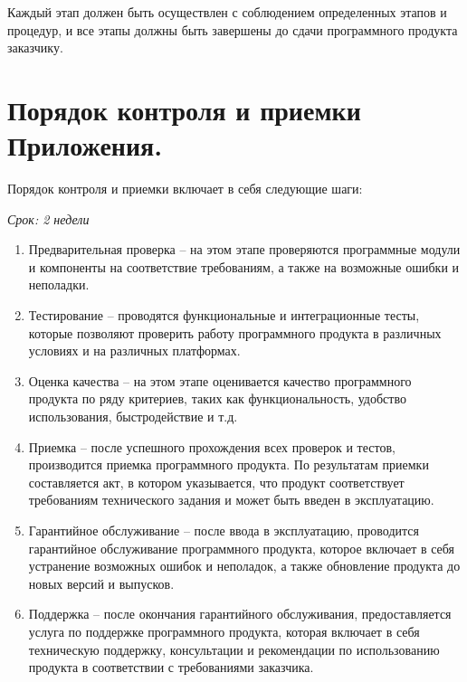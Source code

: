 Каждый этап должен быть осуществлен с соблюдением определенных этапов и процедур, и все этапы должны быть завершены до сдачи программного продукта заказчику.






\newpage
\section{Порядок контроля и приемки Приложения.}







Порядок контроля и приемки включает в себя следующие шаги:

    
    \textit{Срок: 2 недели}
\begin{enumerate}
    \item    Предварительная проверка – на этом этапе проверяются программные модули и компоненты на соответствие требованиям, а также на возможные ошибки и неполадки.
    \item    Тестирование – проводятся функциональные и интеграционные тесты, которые позволяют проверить работу программного продукта в различных условиях и на различных платформах.
    \item    Оценка качества – на этом этапе оценивается качество программного продукта по ряду критериев, таких как функциональность, удобство использования, быстродействие и т.д.
    \item    Приемка – после успешного прохождения всех проверок и тестов, производится приемка программного продукта. По результатам приемки составляется акт, в котором указывается, что продукт соответствует требованиям технического задания и может быть введен в эксплуатацию.
    \item    Гарантийное обслуживание – после ввода в эксплуатацию, проводится гарантийное обслуживание программного продукта, которое включает в себя устранение возможных ошибок и неполадок, а также обновление продукта до новых версий и выпусков.
    \item    Поддержка – после окончания гарантийного обслуживания, предоставляется услуга по поддержке программного продукта, которая включает в себя техническую поддержку, консультации и рекомендации по использованию продукта в соответствии с требованиями заказчика.

\end{enumerate}










